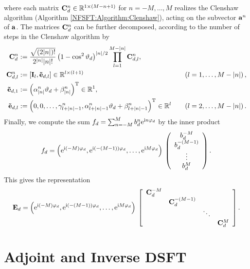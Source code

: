 where each matrix $\mathbf{C}^{n}_{d} \in \mathbb{R}^{1 \times (M-n+1)}$ for $n = -M,\ldots,M$ realizes the Clenshaw algorithm (Algorithm \ref{NFSFT:Algorithm:Clenshaw}), acting on the subvector $\mathbf{a}^n$ of $\mathbf{a}$.
The matrices $\mathbf{C}_{d}^n$ can be further decomposed, according to the number of steps in the Clenshaw algorithm by
\begin{align*}
  \mathbf{C}^{n}_{d}       
  & := \frac{\sqrt{(2|n|)!}}{2^{|n|} |n|!} 
       \left(1-\cos^2\vartheta_{d}\right)^{|n|/2}
       \prod_{l=1}^{M-|n|} \mathbf{C}_{d,l}^{n},\\
  \mathbf{C}_{d,l}^{n}     
  & := \left[\mathbf{I}_{l}, \mathbf{\tilde{e}}_{d,l}\right] \in \mathbb{R}^{l \times (l+1)} 
  & \quad \left(l=1,\ldots,M-|n|\right),\\
  \mathbf{\tilde{e}}_{d,1} 
  & := \left(\alpha_{|n|}^n \vartheta_{d} + \beta_{|n|}^n\right)^{\text{\rm{T}}} 
       \in \mathbb{R}^{1},\\
  \mathbf{\tilde{e}}_{d,l} 
  & := \left(0,0,\ldots,\gamma_{l+|n|-1}^n,\alpha_{l+|n|-1}^n 
       \vartheta_{d} + \beta_{l+|n|-1}^n\right)^{\text{\rm{T}}} \in \mathbb{R}^{l} 
  & \quad \left(l=2,\ldots,M-\left\vert n\right\vert\right).
\end{align*}
Finally, we compute the sum
$%
  f_{d} = \sum_{n=-M}^M b^{n}_{d} \e^{\im n \vphi_{d}}
$ %
by the inner product
\[
  f_{d} 
  = 
  \left(\mbox{\rm{e}}^{\mbox{\scriptsize\rm{i}} (-M) \varphi_{d}},\mbox{\rm{e}}^{\mbox{\scriptsize\rm{i}} (-(M-1)) \varphi_{d}},\ldots,\mbox{\rm{e}}^{\mbox{\scriptsize\rm{i}} M \varphi_{d}}\right)
  \:   
  \left(\begin{array}{c}
    b^{-M}_{d}\\
    b^{-(M-1)}_{d}\\
    \vdots\\
    b^{M}_{d}
  \end{array}\right).
\]
This gives the representation
\[
  \mathbf{E}_{d} = \left(\mbox{\rm{e}}^{\mbox{\scriptsize\rm{i}} (-M) \varphi_{d}},\mbox{\rm{e}}^{\mbox{\scriptsize\rm{i}} (-(M-1)) \varphi_{d}},\ldots,\mbox{\rm{e}}^{\mbox{\scriptsize\rm{i}} M \varphi_{d}}\right) \:  
  \left[\begin{array}{cccc}
    \mathbf{C}^{-M}_{d} &                    &        &               \\
                   & \mathbf{C}^{-(M-1)}_{d} &        &               \\
                   &                    & \ddots &               \\
                   &                    &        & \mathbf{C}^{M}_{d} 
  \end{array}\right].
\]

\section{Adjoint and Inverse DSFT}

